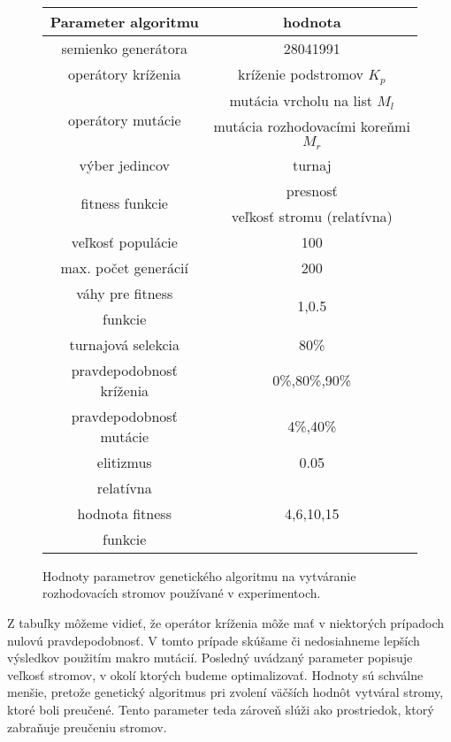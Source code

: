 \begin{figure}[h]
\centering
\begin{tabular}{|c c|}
\hline 
Parameter algoritmu & hodnota \\
\hline
semienko generátora & 28041991 \\
\hline
operátory kríženia & kríženie podstromov $K_p$\\
\hline
\multirow{2}{*}{operátory mutácie} & mutácia vrcholu na list $M_l$ \\
 & mutácia rozhodovacími koreňmi $M_r$\\
\hline
výber jedincov & turnaj \\
\hline
\multirow{2}{*}{fitness funkcie} & presnosť\\
 & veľkosť stromu (relatívna) \\
\hline
veľkosť populácie & 100 \\
\hline
max. počet generácií & 200 \\
\hline
váhy pre fitness & \multirow{2}{*}{1,0.5} \\
funkcie & \\
\hline
turnajová selekcia & 80\% \\
\hline
pravdepodobnosť kríženia & 0\%,80\%,90\%\\
\hline
pravdepodobnosť mutácie & 4\%,40\%\\
\hline
elitizmus & 0.05\\
\hline
relatívna & \multirow{3}{*}{4,6,10,15}\\
hodnota fitness & \\
funkcie & \\
\hline
\end{tabular}
\caption{Hodnoty parametrov genetického algoritmu na vytváranie rozhodovacích stromov používané v experimentoch.}\label{fig:configs}
\end{figure}

Z tabuľky môžeme vidieť, že operátor kríženia môže mať v niektorých prípadoch nulovú pravdepodobnosť. V tomto prípade skúšame či nedosiahneme lepších výsledkov použitím makro mutácií.
Posledný uvádzaný parameter popisuje veľkosť stromov, v okolí ktorých budeme optimalizovať. Hodnoty sú schválne menšie, pretože genetický algoritmus pri zvolení väčších hodnôt vytváral stromy, ktoré boli preučené. Tento parameter teda zároveň slúži ako prostriedok, ktorý zabraňuje preučeniu stromov. 

